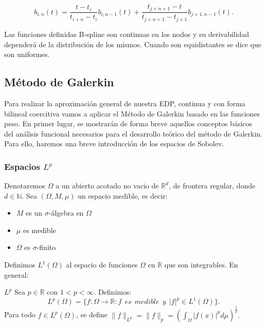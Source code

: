     $$b_{i,n}(t)=\frac{t-t_{i}}{t_{i+n}-t_{i}}b_{i,n-1}(t)+\frac{t_{j+n+1}-t}{t_{j+n+1}-t_{j+1}}b_{j+1,n-1}(t).$$

Las funciones definidas B-spline son continuas en los nodos y su derivabilidad dependerá de la distribución de los mismos. Cuando  son equidistantes se dice que son uniformes.

\subsection{Método de Galerkin}

Para realizar la aproximación general de nuestra EDP, continua y con forma bilineal coercitiva vamos a aplicar el Método de Galerkin basado en las funciones peso. En primer lugar, se mostrarán de forma breve aquellos conceptos básicos del análisis funcional necesarios para el desarrollo teórico del método de Galerkin. Para ello, haremos una breve introducción de los espacios de Sobolev.

\subsubsection{Espacios $L^{p}$}

Denotaremos $\Omega$ a un abierto acotado no vacio de $\mathbb R^{d}$, de frontera regular, donde $d \in \mathbb N$. Sea $(\Omega,M,\mu)$ un espacio medible, es decir:

\begin{itemize}
    \item $M$ es un $\sigma$-álgebra en $\Omega$
    \item $\mu$ es medible
    \item $\Omega$ es $\sigma$-finito
\end{itemize}

Definimos $L^{1}(\Omega)$ al espacio de funciones $\Omega$ en $\mathbb R$ que son integrables. En general:

\begin{definicion1}[label={definicion1},nameref={Title or anything else}]{$L^{p}$}
    Sea $p\in \mathbb R$ con $1<p<\infty$.    Definimos:
    \begin{equation}
        L^{p}(\Omega)=\{f:\Omega \longrightarrow \mathbb R: f \ \ es \ \ medible \ \ y \ \ |f|^{p}\in L^{1}(\Omega)\}.
    \end{equation}
    Para todo $f\in L^{p}(\Omega)$, se define $\|f\|_{L^{p}}=\|f\|_{p}=\displaystyle (\int_{\Omega}|f(x)|^{p}d\mu)^{\frac{1}{p}}.$
    
\end{definicion1}

